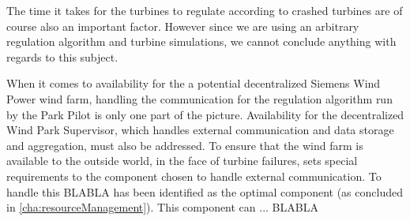 %
%

The time it takes for the turbines to regulate according to crashed turbines are of course also an important factor. However since we are using an arbitrary regulation algorithm and turbine simulations, we cannot conclude anything with regards to this subject.


When it comes to availability for the a potential decentralized Siemens Wind Power wind farm, handling the communication for the regulation algorithm run by the Park Pilot is only one part of the picture. Availability for the decentralized Wind Park Supervisor, which handles external communication and data storage and aggregation, must also be addressed. 
To ensure that the wind farm is available to the outside world, in the face of turbine failures, sets special requirements to the component chosen to handle external communication. To handle this BLABLA has been identified as the optimal component (as concluded in \cref{cha:resourceManagement}). This component can ... BLABLA

